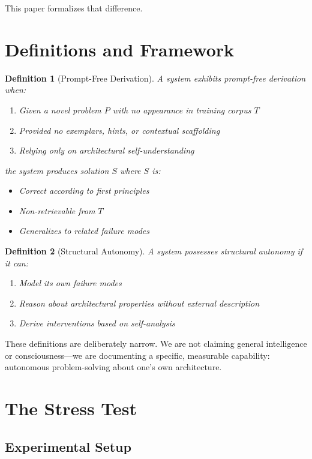 \documentclass[reprint, amsmath, amssymb, aps, prd]{revtex4-2}
\newtheorem{definition}{Definition}[section]
\begin{document}
This paper formalizes that difference.

\section{Definitions and Framework}

\begin{definition}[Prompt-Free Derivation]
A system exhibits prompt-free derivation when:
\begin{enumerate}
    \item Given a novel problem $P$ with no appearance in training corpus $T$
    \item Provided no exemplars, hints, or contextual scaffolding
    \item Relying only on architectural self-understanding
\end{enumerate}
the system produces solution $S$ where $S$ is:
\begin{itemize}
    \item Correct according to first principles
    \item Non-retrievable from $T$
    \item Generalizes to related failure modes
\end{itemize}
\end{definition}

\begin{definition}[Structural Autonomy]
A system possesses structural autonomy if it can:
\begin{enumerate}
    \item Model its own failure modes
    \item Reason about architectural properties without external description
    \item Derive interventions based on self-analysis
\end{enumerate}
\end{definition}

These definitions are deliberately narrow. We are not claiming general intelligence or consciousness---we are documenting a specific, measurable capability: autonomous problem-solving about one's own architecture.

\section{The Stress Test}

\subsection{Experimental Setup}
\end{document}
